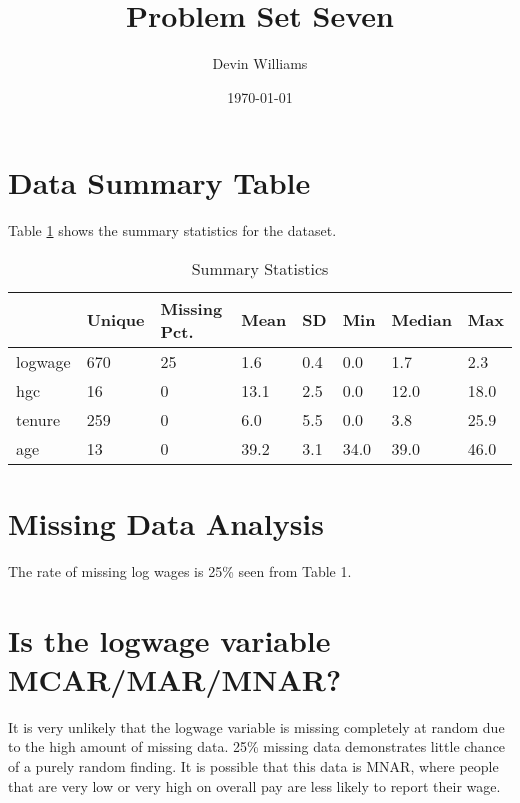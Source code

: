 \documentclass[12pt,letterpaper]{article}
\title{\textbf{Problem Set Seven}}
\author{Devin Williams}
\date{\today}
\begin{document}
\maketitle

\section{Data Summary Table}
Table \ref{tab:summary} shows the summary statistics for the dataset.
\begin{table}[h!] %
\centering
\caption{Summary Statistics}
\label{tab:summary}
\begin{tabular}[t]{llllllll}
\toprule
  & Unique & Missing Pct. & Mean & SD & Min & Median & Max\\
\midrule
logwage & 670 & 25 & \num{1.6} & \num{0.4} & \num{0.0} & \num{1.7} & \num{2.3}\\
hgc & 16 & 0 & \num{13.1} & \num{2.5} & \num{0.0} & \num{12.0} & \num{18.0}\\
tenure & 259 & 0 & \num{6.0} & \num{5.5} & \num{0.0} & \num{3.8} & \num{25.9}\\
age & 13 & 0 & \num{39.2} & \num{3.1} & \num{34.0} & \num{39.0} & \num{46.0}\\
\bottomrule
\end{tabular}
\end{table}

\section{Missing Data Analysis}
The rate of missing log wages is 25\% seen from Table 1. 
\section{Is the logwage variable MCAR/MAR/MNAR?}
It is very unlikely that the logwage variable is missing completely at random due to the high amount of missing data. 25\% missing data demonstrates little chance of a purely random finding. It is possible that this data is MNAR, where people that are very low or very high on overall pay are less likely to report their wage. 


\clearpage %
\vspace*{1in} %
\end{document}
